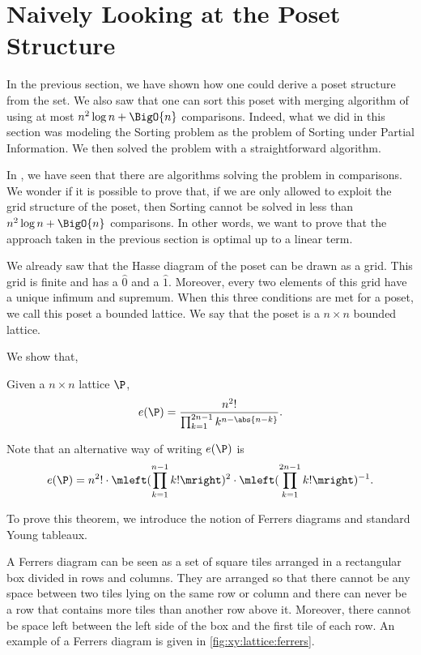 \section{Naively Looking at the Poset Structure}
\label{tree:xy:grid}

In the previous section, we have shown how one could derive a poset structure
from the \XY set. We also saw that one can sort this \XY poset with
merging algorithm of 
using at most \(n^2 \log n + \BigO{n}\) comparisons. Indeed, what we
did in this section was modeling the Sorting \XY problem as the problem of
Sorting under Partial Information. We then solved the problem with a
straightforward algorithm.

In , we have seen that there are algorithms solving the \SUPI
problem in  comparisons. We wonder if it is possible to prove
that, if we are only allowed to exploit the grid structure of the \XY poset,
then Sorting \XY cannot be solved in less than \(n^2 \log n + \BigO{n}\)
comparisons. In other words, we want to prove that the approach taken in the
previous section is optimal up to a linear term.

We already saw that the Hasse diagram of the poset \XY can be drawn as a grid.
This grid is finite and has a \(\hat{0}\) and a \(\hat{1}\). Moreover, every
two elements of this grid have a unique infimum and supremum. When this three
conditions are met for a poset, we call this poset a bounded lattice. We say
that the poset \XY is a \( n \times n \) bounded lattice.

We show that,
\begin{theorem}
Given a \( n \times n \) lattice \(\P\),
\begin{displaymath}
e(\P) = \frac{n^2!}{\prod_{k=1}^{2n-1} k^{n - \abs{n-k}}}.
\end{displaymath}
\end{theorem}
Note that an alternative way of writing \(e(\P)\) is
\begin{displaymath}
e(\P) = n^2! \cdot \mleft(\prod_{k=1}^{n-1} k!\mright)^2 \cdot
\mleft(\prod_{k=1}^{2n-1} k!\mright)^{-1}.
\end{displaymath}

To prove this theorem, we introduce the notion of Ferrers diagrams and standard Young tableaux.

A Ferrers diagram can be seen as a set of square tiles arranged in a
rectangular
box divided in rows and columns. They are arranged so that there cannot be any space between two tiles
lying on the same row or column and there can never be a row that contains more
tiles than another row above it. Moreover, there cannot be space left between
the left side of the box and the first tile of each row. An example of a
Ferrers diagram is given in \ref{fig:xy:lattice:ferrers}.

